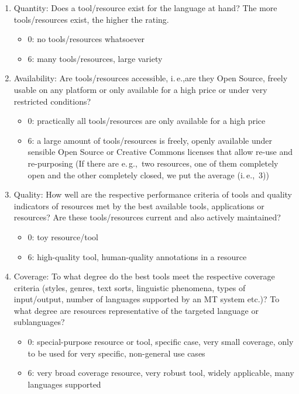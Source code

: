 \begin{multicols}{2}
\begin{enumerate}
\item Quantity: Does a tool/resource exist for the language at hand? The more tools/resources exist, the higher the rating.
\begin{itemize}
\item 0: no tools/resources whatsoever
\item 6: many tools/resources, large variety
\end{itemize}
\item Availability: Are tools/resources accessible, i.\,e.,are they Open Source, freely usable on any platform or only available for a high price or under very restricted conditions?
\begin{itemize}
\item 0: practically all tools/resources are only available for a high price
\item 6: a large amount of tools/resources is freely, openly available under sensible Open Source or Creative Commons licenses that allow re-use and re-purposing (If there are e.\,g.,~two resources, one of them completely open and the other completely closed, we put the average (i.\,e.,~3))
\end{itemize}
\item Quality: How well are the respective performance criteria of tools and quality indicators of resources met by the best available tools, applications or resources? Are these tools/resources current and also actively maintained?
\begin{itemize}
\item 0: toy resource/tool
\item 6: high-quality tool, human-quality annotations in a resource
\end{itemize}
\item Coverage: To what degree do the best tools meet the respective coverage criteria (styles, genres, text sorts, linguistic phenomena, types of input/output, number of languages supported by an MT system etc.)? To what degree are resources representative of the targeted language or sublanguages?
\begin{itemize}
\item 0: special-purpose resource or tool, specific case, very small coverage, only to be used for very specific, non-general use cases
\item 6: very broad coverage resource, very robust tool, widely applicable, many languages supported
\end{itemize}

\end{enumerate}
\end{multicols}
